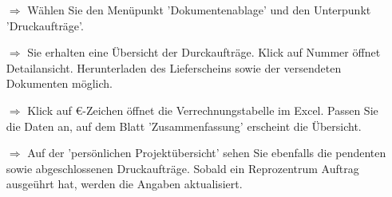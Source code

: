 \documentclass{article}
\begin{document}
\begin{multicols}{2}

\begin{tcolorbox}[colback=blue!5,colframe=blue!40!black,title=Druckaufträge Übersicht]
\begin{itemize}
  \item[$\Longrightarrow$] Wählen Sie den Menüpunkt 'Dokumentenablage' und den Unterpunkt 'Druckaufträge'.
  \item[$\Longrightarrow$] Sie erhalten eine Übersicht der Durckaufträge. Klick auf Nummer öffnet Detailansicht. Herunterladen des Lieferscheins sowie der versendeten Dokumenten möglich.
  \item[$\Longrightarrow$] Klick auf \euro{-Zeichen} öffnet die Verrechnungstabelle im Excel. Passen Sie die Daten an, auf dem Blatt 'Zusammenfassung' erscheint die Übersicht.
  \item[$\Longrightarrow$] Auf der 'persönlichen Projektübersicht' sehen Sie ebenfalls die pendenten sowie abgeschlossenen Druckaufträge. Sobald ein Reprozentrum Auftrag ausgeührt hat, werden die Angaben aktualisiert. 
\end{itemize}
\end{tcolorbox}


\begin{tcolorbox}[colback=blue!5,colframe=blue!40!black]

\begin{centering}
\end{centering}

\begin{centering}
\vspace{-15pt}
\end{centering}

\end{tcolorbox}
\end{multicols}
\end{document}
